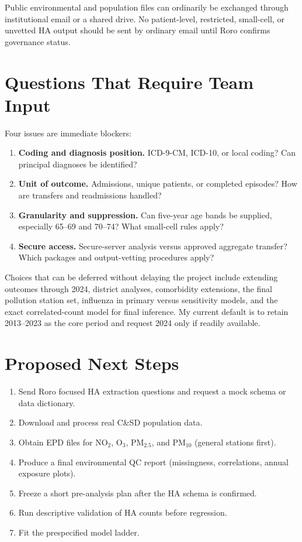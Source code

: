 \documentclass[11pt]{article}
\begin{document}
Public environmental and population files can ordinarily be exchanged through
institutional email or a shared drive. No patient-level, restricted,
small-cell, or unvetted HA output should be sent by ordinary email until Roro
confirms governance status.

\section{Questions That Require Team Input}

Four issues are immediate blockers:

\begin{enumerate}
    \item \textbf{Coding and diagnosis position.} ICD-9-CM, ICD-10, or local
    coding? Can principal diagnoses be identified?
    \item \textbf{Unit of outcome.} Admissions, unique patients, or completed
    episodes? How are transfers and readmissions handled?
    \item \textbf{Granularity and suppression.} Can five-year age bands be
    supplied, especially 65--69 and 70--74? What small-cell rules apply?
    \item \textbf{Secure access.} Secure-server analysis versus approved
    aggregate transfer? Which packages and output-vetting procedures apply?
\end{enumerate}

Choices that can be deferred without delaying the project include extending
outcomes through 2024, district analyses, comorbidity extensions, the final
pollution station set, influenza in primary versus sensitivity models, and the
exact correlated-count model for final inference. My current default is to
retain 2013--2023 as the core period and request 2024 only if readily
available.

\section{Proposed Next Steps}

\begin{enumerate}
    \item Send Roro focused HA extraction questions and request a mock schema
    or data dictionary.
    \item Download and process real C\&SD population data.
    \item Obtain EPD files for NO$_2$, O$_3$, PM$_{2.5}$, and PM$_{10}$
    (general stations first).
    \item Produce a final environmental QC report (missingness, correlations,
    annual exposure plots).
    \item Freeze a short pre-analysis plan after the HA schema is confirmed.
    \item Run descriptive validation of HA counts before regression.
    \item Fit the prespecified model ladder.
\end{enumerate}
\end{document}
